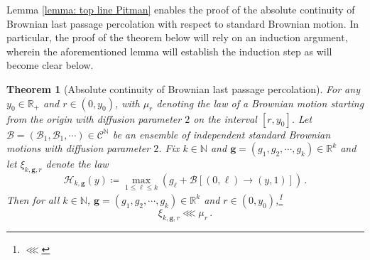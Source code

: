 \documentclass[12pt]{report}
\theoremstyle{plain}
\newtheorem{theorem}{Theorem}[section]
\newcommand{\N}{\ensuremath{\mathbb{N}}}
\newcommand{\R}{\ensuremath{\mathbb{R}}}
\begin{document}
Lemma \ref{lemma: top line Pitman} enables the proof of the absolute continuity of Brownian last passage percolation with respect to standard Brownian motion. In particular, the proof of the theorem below will rely on an induction argument, wherein the aforementioned lemma will establish the induction step as will become clear below.

\begin{theorem}[Absolute continuity of Brownian last passage percolation]\label{thm: abs cont brownian lpp}
    For any $y_0\in\R_+$ and $r\in(0,y_0)$, with $\mu_r$ denoting the law of a Brownian motion starting from the origin with diffusion parameter $2$ on the interval $[r,y_0]$. Let $\mathbf{\mathcal{B}} = (\mathcal{B}_1, \mathcal{B}_1, \cdots)\in\mathcal{C}^{\N}$ be an ensemble of independent standard Brownian motions with diffusion parameter $2$. Fix $k\in\N$ and $\mathbf{g}=(g_1,g_2,\cdots, g_k)\in\R^k$ and let $\xi_{k,\mathbf{g},r}$ denote the law
    \[
     \mathcal{H}_{k,\mathbf{g}}(y) \coloneqq \displaystyle\max_{1\leq \ell\leq k}(g_\ell+\mathbf{\mathcal{B}}[(0,\ell)\to(y,1)])\,.
    \]
    Then for all $k\in\N$, $\mathbf{g}=(g_1,g_2,\cdots, g_k)\in\R^k$ and $r\in(0,y_0)$,\footnote{$\lll$ }
    \[
    \xi_{k,\mathbf{g},r}\lll \mu_r\,.
    \]
\end{theorem}
\end{document}
